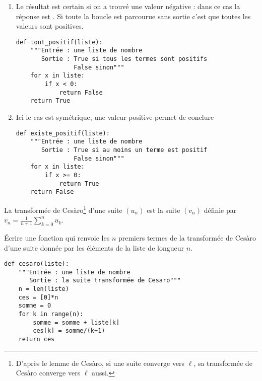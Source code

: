 \begin{Answer}
\begin{enumerate}
\item Le résultat est certain si on a trouvé une valeur négative : dans ce cas la réponse est . Si toute la boucle est parcourue sans sortie c'est que toutes les valeurs sont positives.
\begin{lstlisting}
def tout_positif(liste):
    """Entrée : une liste de nombre
       Sortie : True si tous les termes sont positifs
                False sinon"""
    for x in liste:
        if x < 0:
            return False
    return True
\end{lstlisting}
\item Ici le cas est symétrique, une valeur positive permet de conclure 
\begin{lstlisting}
def existe_positif(liste):
    """Entrée : une liste de nombre
       Sortie : True si au moins un terme est positif
                False sinon"""
    for x in liste:
        if x >= 0:
            return True
    return False
\end{lstlisting}
\end{enumerate}
\end{Answer}
\begin{Exercise}[title=Transformation de Cesàro]

La transformée de Cesàro\footnote{D'après le lemme de Cesàro, si une suite converge vers $\ell$,  sa transformée de Cesàro converge vers $\ell$ aussi.} d'une suite $(u_n)$ est la suite $(v_n)$ définie par $\displaystyle v_n= \frac 1{n +1}\sum_{k=0}^n u_k$. 



 Écrire une fonction  qui renvoie les $n$ premiers termes de la transformée de Cesàro d'une suite donnée par les éléments de la liste de longueur $n$.
\end{Exercise}
\begin{Answer}
\begin{lstlisting}
def cesaro(liste):
    """Entrée : une liste de nombre
       Sortie : la suite transformée de Cesaro"""
    n = len(liste)
    ces = [0]*n
    somme = 0
    for k in range(n):
        somme = somme + liste[k]
        ces[k] = somme/(k+1)
    return ces
\end{lstlisting}
\end{Answer}

